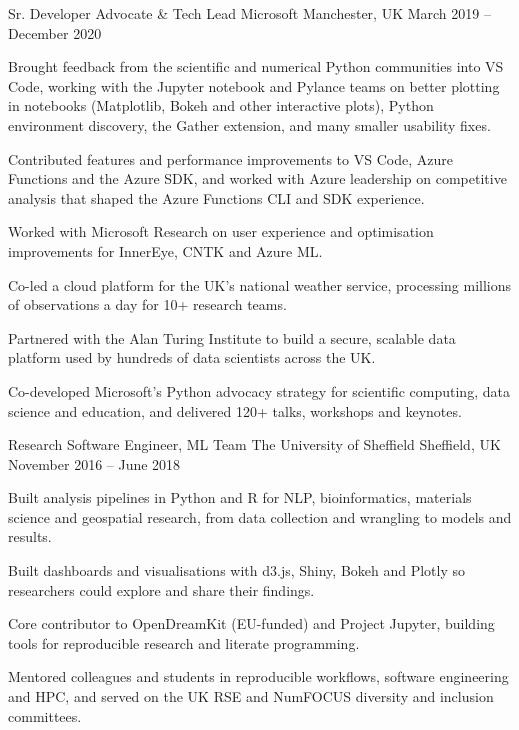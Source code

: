 \begin{cventries}
\cventry
{Sr. Developer Advocate \& Tech Lead}
{Microsoft}
{Manchester, UK}
{March 2019 -- December 2020}
{
\begin{cvitems}
  \item {Brought feedback from the scientific and numerical Python communities into VS Code, working with the Jupyter notebook and Pylance teams on better plotting in notebooks (Matplotlib, Bokeh and other interactive plots), Python environment discovery, the Gather extension, and many smaller usability fixes.}
  \item {Contributed features and performance improvements to VS Code, Azure Functions and the Azure SDK, and worked with Azure leadership on competitive analysis that shaped the Azure Functions CLI and SDK experience.}
  \item {Worked with Microsoft Research on user experience and optimisation improvements for InnerEye, CNTK and Azure ML.}
  \item {Co-led a cloud platform for the UK's national weather service, processing millions of observations a day for 10+ research teams.}
  \item {Partnered with the Alan Turing Institute to build a secure, scalable data platform used by hundreds of data scientists across the UK.}
  \item {Co-developed Microsoft's Python advocacy strategy for scientific computing, data science and education, and delivered 120+ talks, workshops and keynotes.}
\end{cvitems}
}




\cventry
{Research Software Engineer, ML Team}
{The University of Sheffield}
{Sheffield, UK}
{November 2016 -- June 2018}
{
\begin{cvitems}
  \item {Built analysis pipelines in Python and R for NLP, bioinformatics, materials science and geospatial research, from data collection and wrangling to models and results.}
  \item {Built dashboards and visualisations with d3.js, Shiny, Bokeh and Plotly so researchers could explore and share their findings.}
  \item {Core contributor to OpenDreamKit (EU-funded) and Project Jupyter, building tools for reproducible research and literate programming.}
  \item {Mentored colleagues and students in reproducible workflows, software engineering and HPC, and served on the UK RSE and NumFOCUS diversity and inclusion committees.}
\end{cvitems}
}



\end{cventries}
